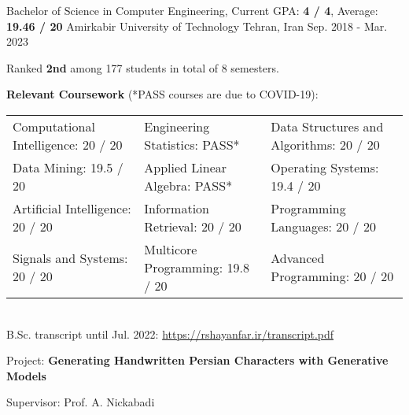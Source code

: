 

\begin{cventries}

  \cventry
    {Bachelor of Science in Computer Engineering, Current GPA: \textbf{4 / 4}, Average: \textbf{19.46 / 20}} %
    {Amirkabir University of Technology} %
    {Tehran, Iran} %
    {Sep. 2018 - Mar. 2023} %
    {
      \begin{cvitems}
        \item{Ranked \textbf{2nd} among 177 students in total of 8 semesters.}
        \item{
          \textbf{Relevant Coursework} (*PASS courses are due to COVID-19):
          \smallskip
          \begin{adjustwidth}{4mm}{}
            \begin{tabular}{l@{\hskip 5mm}l@{\hskip 5mm}l}
              Computational Intelligence: 20 / 20 & Engineering Statistics: PASS*    & Data Structures and Algorithms: 20 / 20 \\
              Data Mining: 19.5 / 20              & Applied Linear Algebra: PASS*    & Operating Systems: 19.4 / 20            \\
              Artificial Intelligence: 20 / 20    & Information Retrieval: 20 / 20   & Programming Languages: 20 / 20          \\
              Signals and Systems: 20 / 20        & Multicore Programming: 19.8 / 20 & Advanced Programming: 20 / 20  
            \end{tabular}
            \\[2mm]
          	\textcolor{awesome-nephritis}{B.Sc. transcript until Jul. 2022: \href{https://rshayanfar.ir/transcript.pdf}{https://rshayanfar.ir/transcript.pdf}}
          	\medskip
          \end{adjustwidth}
        }
        \item{
          Project: \textbf{Generating Handwritten Persian Characters with Generative Models}
        }
        \item{
          Supervisor: Prof. A. Nickabadi
        }
      \end{cvitems}
    }


\end{cventries}
